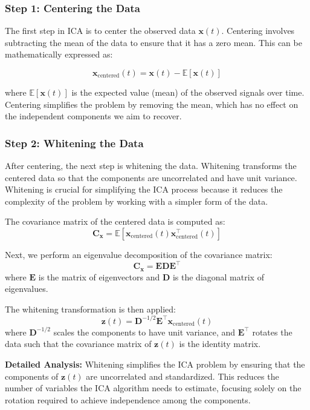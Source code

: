 \documentclass{exam}
\begin{document}
\subsubsection{Step 1: Centering the Data}

The first step in ICA is to center the observed data \( \mathbf{x}(t) \). Centering involves subtracting the mean of the data to ensure that it has a zero mean. This can be mathematically expressed as:

\[
\mathbf{x}_{\text{centered}}(t) = \mathbf{x}(t) - \mathbb{E}[\mathbf{x}(t)]
\]

where \( \mathbb{E}[\mathbf{x}(t)] \) is the expected value (mean) of the observed signals over time. Centering simplifies the problem by removing the mean, which has no effect on the independent components we aim to recover.

\subsubsection{Step 2: Whitening the Data}

After centering, the next step is whitening the data. Whitening transforms the centered data so that the components are uncorrelated and have unit variance. Whitening is crucial for simplifying the ICA process because it reduces the complexity of the problem by working with a simpler form of the data.

The covariance matrix of the centered data is computed as:
\[
\mathbf{C}_{\mathbf{x}} = \mathbb{E}[\mathbf{x}_{\text{centered}}(t) \mathbf{x}_{\text{centered}}^\top(t)]
\]

Next, we perform an eigenvalue decomposition of the covariance matrix:
\[
\mathbf{C}_{\mathbf{x}} = \mathbf{E} \mathbf{D} \mathbf{E}^\top
\]
where \( \mathbf{E} \) is the matrix of eigenvectors and \( \mathbf{D} \) is the diagonal matrix of eigenvalues.

The whitening transformation is then applied:
\[
\mathbf{z}(t) = \mathbf{D}^{-1/2} \mathbf{E}^\top \mathbf{x}_{\text{centered}}(t)
\]
where \( \mathbf{D}^{-1/2} \) scales the components to have unit variance, and \( \mathbf{E}^\top \) rotates the data such that the covariance matrix of \( \mathbf{z}(t) \) is the identity matrix.

\textbf{Detailed Analysis:} Whitening simplifies the ICA problem by ensuring that the components of \( \mathbf{z}(t) \) are uncorrelated and standardized. This reduces the number of variables the ICA algorithm needs to estimate, focusing solely on the rotation required to achieve independence among the components.
\end{document}
